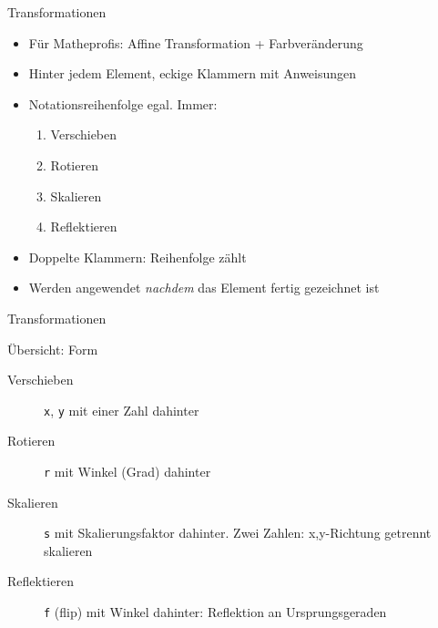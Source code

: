 \documentclass{beamer}
\theoremstyle{example}
\begin{document}
\begin{frame}{Transformationen}
  \begin{itemize}
  \item Für Matheprofis: Affine Transformation + Farbveränderung
  \item Hinter jedem Element, eckige Klammern mit Anweisungen
  \item Notationsreihenfolge egal. Immer:
    \begin{enumerate}
    \item Verschieben
    \item Rotieren
    \item Skalieren
    \item Reflektieren
    \end{enumerate}
  \item Doppelte Klammern: Reihenfolge zählt
  \item Werden angewendet \emph{nachdem} das Element fertig gezeichnet ist
  \end{itemize}
\end{frame}

\begin{frame}{Transformationen}
\begin{block}{Übersicht: Form}
  \begin{description}
  \item[Verschieben] \lstinline!x!, \lstinline!y! mit einer Zahl dahinter
  \item[Rotieren] \lstinline!r! mit Winkel (Grad) dahinter
  \item[Skalieren] \lstinline!s! mit Skalierungsfaktor dahinter. Zwei Zahlen: x,y-Richtung getrennt skalieren
  \item[Reflektieren] \lstinline!f! (flip) mit Winkel dahinter: Reflektion an Ursprungsgeraden
  \end{description}
\end{block}
\end{frame}
\end{document}
